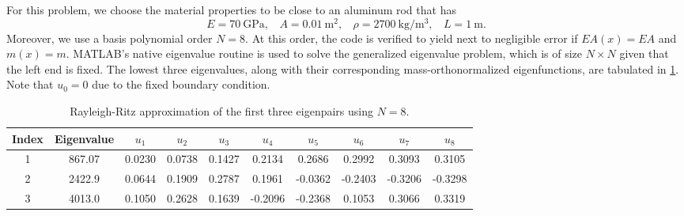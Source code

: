For this problem, we choose the material properties to be close to an aluminum rod that has 
\begin{equation}
    E = \qty{70}{\giga\pascal}, ~~~~ A = \qty{0.01}{\m\squared}, ~~~~ \rho = \qty{2700}{\kg\per\m\cubed}, ~~~~ L = \qty{1}{\m}.
\end{equation}
Moreover, we use a basis polynomial order $N = 8$. 
At this order, the code is verified to yield next to negligible error if $EA(x) = EA$ and $m(x) = m$.
MATLAB's native eigenvalue routine is used to solve the generalized eigenvalue problem, which is of size $N \times N$ given that the left end is fixed. 
The lowest three eigenvalues, along with their corresponding mass-orthonormalized eigenfunctions, are tabulated in \cref{tab:hw3_p3_results}. 
Note that $u_0 = 0$ due to the fixed boundary condition. 
\begin{table}[!ht]
    \centering
    \begin{tabular}{|c|c|c|c|c|c|c|c|c|c|}
        \hline
        Index & Eigenvalue & $u_1$ & $u_2$ & $u_3$ & $u_4$ & $u_5$ & $u_6$ & $u_7$ & $u_8$ \\
        \hline 
        1 & 867.07 & 0.0230 & 0.0738 & 0.1427 & 0.2134 & 0.2686 & 0.2992 & 0.3093 & 0.3105 \\
        \hline 
        2 & 2422.9 & 0.0644 & 0.1909 & 0.2787 & 0.1961 & -0.0362 & -0.2403 & -0.3206 & -0.3298 \\
        \hline 
        3 & 4013.0 & 0.1050 & 0.2628 & 0.1639 & -0.2096 & -0.2368 & 0.1053 & 0.3066 & 0.3319 \\
        \hline 
    \end{tabular}
    \caption{Rayleigh-Ritz approximation of the first three eigenpairs using $N = 8$. }
    \label{tab:hw3_p3_results}
\end{table}

